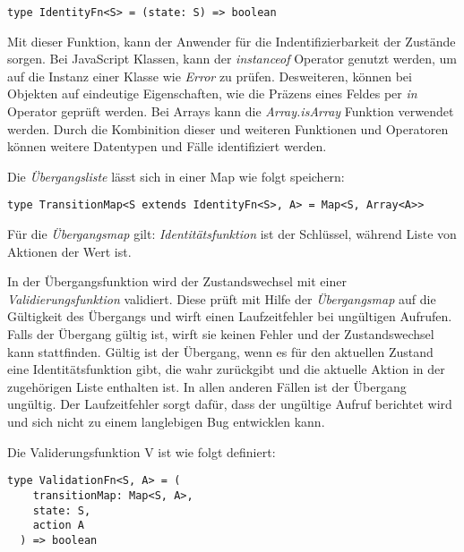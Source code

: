 \begin{lstlisting}
type IdentityFn<S> = (state: S) => boolean
\end{lstlisting}


Mit dieser Funktion, kann der Anwender für die Indentifizierbarkeit der Zustände sorgen. Bei JavaScript Klassen, kann der \textit{instanceof} Operator genutzt werden, um auf die Instanz einer Klasse wie \textit{Error} zu prüfen.\cite{jsInstanceofOperator} Desweiteren, können bei Objekten auf eindeutige Eigenschaften, wie die Präzens eines Feldes per \textit{in} Operator geprüft werden.\cite{jsInOperator} Bei Arrays kann die \textit{Array.isArray} Funktion verwendet werden.\cite{jsIsArray} Durch die Kombinition dieser und weiteren Funktionen und Operatoren können weitere Datentypen und Fälle identifiziert werden.

Die \textit{Übergangsliste} lässt sich in einer Map wie folgt speichern:

\begin{lstlisting}
type TransitionMap<S extends IdentityFn<S>, A> = Map<S, Array<A>>
\end{lstlisting}

Für die \textit{Übergangsmap} gilt: \textit{Identitätsfunktion} ist der Schlüssel, während Liste von Aktionen der Wert ist.

In der Übergangsfunktion wird der Zustandswechsel mit einer \textit{Validierungsfunktion} validiert. Diese prüft mit Hilfe der \textit{Übergangsmap} auf die Gültigkeit des Übergangs und wirft einen Laufzeitfehler bei ungültigen Aufrufen. Falls der Übergang gültig ist, wirft sie keinen Fehler und der Zustandswechsel kann stattfinden. Gültig ist der Übergang, wenn es für den aktuellen Zustand eine Identitätsfunktion gibt, die wahr zurückgibt und die aktuelle Aktion in der zugehörigen Liste enthalten ist. In allen anderen Fällen ist der Übergang ungültig.
Der Laufzeitfehler sorgt dafür, dass der ungültige Aufruf berichtet wird und sich nicht zu einem langlebigen Bug entwicklen kann.

Die Validerungsfunktion V ist wie folgt definiert:

\begin{lstlisting}
type ValidationFn<S, A> = (
    transitionMap: Map<S, A>,
    state: S,
    action A
  ) => boolean
\end{lstlisting}

